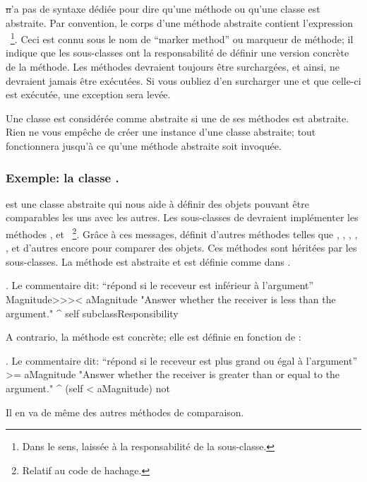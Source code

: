 \documentclass[a4paper,10pt,twoside]{book}
\begin{document}
\st n'a pas de syntaxe dédiée pour dire qu'une méthode ou qu'une classe est abstraite. 
Par convention, le corps d'une méthode abstraite contient l'expression ~\footnote{Dans le sens, laissée à la responsabilité de la sous-classe.}. 
Ceci est connu sous le nom de ``marker method'' ou marqueur de méthode; il indique que les sous-classes ont la responsabilité de définir une version concrète de la méthode. 
Les méthodes  devraient toujours être surchargées, et ainsi, ne devraient jamais être exécutées.
Si vous oubliez d'en surcharger une et que celle-ci est exécutée, une exception sera levée. 

Une classe est considérée comme abstraite si une de ses méthodes est abstraite.
Rien ne vous empêche de créer une instance d'une classe abstraite; tout fonctionnera jusqu'à ce qu'une méthode abstraite soit invoquée. 

\subsubsection{Exemple: la classe .}
 est une classe abstraite qui nous aide à définir
des objets pouvant être comparables les uns avec les autres. Les
sous-classes de  devraient implémenter les méthodes
\ct{<}, \ct{=} et ~\footnote{Relatif au code de hachage.}.
Grâce à ces messages,  définit d'autres méthodes telles que
\mbox{\ct{>},} \mbox{\ct{>=},} \mbox{\ct{<=},} \mbox{,} \mbox{,}  et
d'autres encore pour comparer des objets.
Ces méthodes sont héritées par les sous-classes.
La méthode  est abstraite et est définie comme
dans .

\begin{method}[MagnitudeLessThan]{. Le commentaire dit: ``répond si le receveur est inférieur à l'argument''}
Magnitude>>>< aMagnitude 
	"Answer whether the receiver is less than the argument."
	^ self subclassResponsibility
\end{method}

\noindent
A contrario, la méthode  est concrète; elle est définie en fonction de \ct{<}:

\begin{method}[Magnitude>=]{. Le commentaire dit: ``répond si le receveur est plus grand ou égal à l'argument''}
>= aMagnitude 
	"Answer whether the receiver is greater than or equal to the argument."
	^ (self < aMagnitude) not
\end{method}
Il en va de même des autres méthodes de comparaison.
\end{document}
